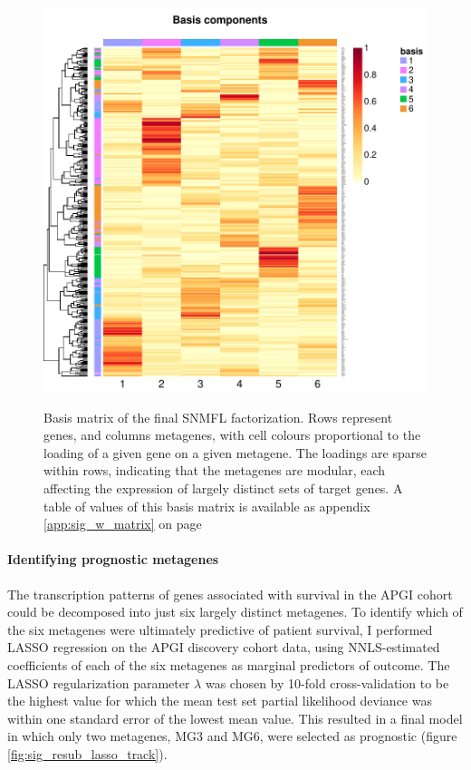 \documentclass[dissertation.tex]{subfiles}
\begin{document}
\begin{figure}
\centering
\includegraphics[width=.7\linewidth]{analysis/biosurv/reports/18_SIS_diag_dsd_final/figure/nmf-plots-2}
\label{fig:sig_nmf_basis}
\caption{Basis matrix of the final \acrshort{SNMFL} factorization.  Rows represent genes, and columns metagenes, with cell colours proportional to the loading of a given gene on a given metagene.  The loadings are sparse within rows, indicating that the metagenes are modular, each affecting the expression of largely distinct sets of target genes.  A table of values of this basis matrix is available as appendix \ref{app:sig_w_matrix} on page \pageref{app:sig_w_matrix}}
\end{figure}

\paragraph{Identifying prognostic metagenes}
The transcription patterns of genes associated with survival in the \gls{APGI} cohort could be decomposed into just six largely distinct metagenes.  To identify which of the six metagenes were ultimately predictive of patient survival, I performed \gls{LASSO} regression on the \gls{APGI} discovery cohort data, using \gls{NNLS}-estimated coefficients of each of the six metagenes as marginal predictors of outcome.  The \gls{LASSO} regularization parameter $\lambda$ was chosen by 10-fold cross-validation to be the highest value for which the mean test set partial likelihood deviance was within one standard error of the lowest mean value.  This resulted in a final model in which only two metagenes, MG3 and MG6, were selected as prognostic (figure \ref{fig:sig_resub_lasso_track}).
\end{document}
